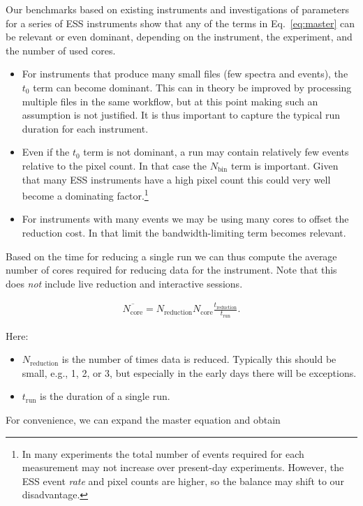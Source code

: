 \documentclass[a4paper,english,numbers=noenddot,bibliography=totoc,chapterprefix=on,DIV=12]{scrartcl}
\newcommand{\Treduction}{t_{\text{reduction}}}
\newcommand{\Trun}{t_{\text{run}}}
\newcommand{\Nbin}{N_{\text{bin}}}
\newcommand{\Ncore}{N_{\text{core}}}
\newcommand{\Nreduction}{N_{\text{reduction}}}
\begin{document}
Our benchmarks based on existing instruments and investigations of parameters for a series of ESS instruments show that any of the terms in Eq.~\eqref{eq:master} can be relevant or even dominant, depending on the instrument, the experiment, and the number of used cores.

\begin{itemize}
  \item 
    For instruments that produce many small files (few spectra and events), the $t_0$ term can become dominant.
    This can in theory be improved by processing multiple files in the same workflow, but at this point making such an assumption is not justified.
    It is thus important to capture the typical run duration for each instrument.
  \item
    Even if the $t_0$ term is not dominant, a run may contain relatively few events relative to the pixel count.
    In that case the $\Nbin$ term is important.
    Given that many ESS instruments have a high pixel count this could very well become a dominating factor.\footnote{In many experiments the total number of events required for each measurement may not increase over present-day experiments. However, the ESS event \emph{rate} and pixel counts are higher, so the balance may shift to our disadvantage.}
  \item
    For instruments with many events we may be using many cores to offset the reduction cost.
    In that limit the bandwidth-limiting term becomes relevant.
\end{itemize}

Based on the time for reducing a single run we can thus compute the average number of cores required for reducing data for the instrument.
Note that this does \emph{not} include live reduction and interactive sessions.

\begin{align}
  \overline{\Ncore} = \Nreduction \Ncore \frac{\Treduction}{\Trun}.
\end{align}

Here:

\begin{itemize}
  \item $\Nreduction$ is the number of times data is reduced.
    Typically this should be small, e.g., 1, 2, or 3, but especially in the early days there will be exceptions.
  \item $\Trun$ is the duration of a single run.
\end{itemize}

For convenience, we can expand the master equation and obtain
\end{document}
